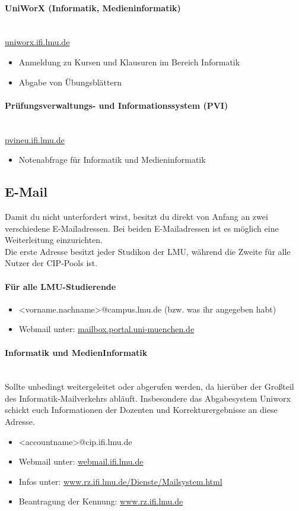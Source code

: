 \paragraph{UniWorX (Informatik, Medieninformatik)}\hfill\\
\url{uniworx.ifi.lmu.de}
\begin{itemize}
	\item Anmeldung zu Kursen und Klausuren im Bereich Informatik
	\item Abgabe von Übungsblättern
\end{itemize}

\paragraph{Prüfungsverwaltungs- und Informationssystem (PVI)}\hfill\\
\url{pvineu.ifi.lmu.de}
\begin{itemize}
	\item Notenabfrage für Informatik und Medieninformatik
\end{itemize}

\clearpage

\subsection{E-Mail}
Damit du nicht unterfordert wirst, besitzt du direkt von Anfang an zwei verschiedene E-Mailadressen. Bei beiden E-Mailadressen ist es möglich eine Weiterleitung einzurichten.\\

Die erste Adresse besitzt jeder Studikon der LMU, während die Zweite für alle Nutzer der CIP-Pools ist.

\paragraph{Für alle LMU-Studierende}
\begin{itemize}
	\item <vorname.nachname>@campus.lmu.de (bzw. was ihr angegeben habt)
	\item Webmail unter: \url{mailbox.portal.uni-muenchen.de}
\end{itemize}

\paragraph{Informatik und MedienInformatik}\hfill\\
Sollte unbedingt weitergeleitet oder abgerufen werden, da hierüber der Großteil des Informatik-Mailverkehrs abläuft. Insbesondere das Abgabesystem Uniworx schickt euch Informationen der Dozenten und Korrekturergebnisse an diese Adresse.
\begin{itemize}
	\item <accountname>@cip.ifi.lmu.de
	\item Webmail unter: \url{webmail.ifi.lmu.de}
	\item Infos unter: \url{www.rz.ifi.lmu.de/Dienste/Mailsystem.html}
	\item Beantragung der Kennung: \url{www.rz.ifi.lmu.de}
\end{itemize}

